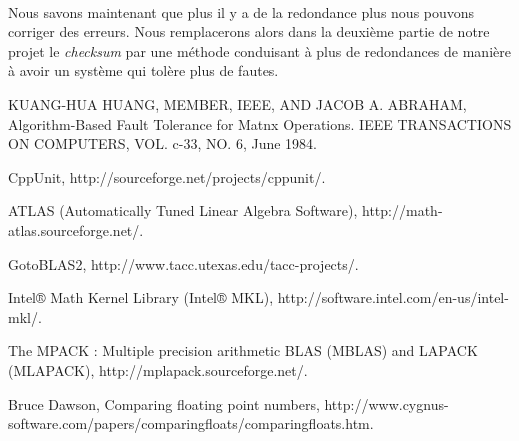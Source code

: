 \documentclass[a4paper, 10pt]{report}
\begin{document}
\paragraph*{}
Nous savons maintenant que plus il y a de la redondance plus nous pouvons corriger des erreurs.
Nous remplacerons alors dans la deuxième partie de notre projet le \textit{checksum} par une méthode conduisant à plus de 
redondances de manière à avoir un système qui tolère plus de fautes.

\begin{thebibliography}{1}

KUANG-HUA HUANG, MEMBER, IEEE, AND JACOB A. ABRAHAM,
Algorithm-Based Fault Tolerance for Matnx Operations.
IEEE TRANSACTIONS ON COMPUTERS,
VOL. c-33,
NO. 6,
June 1984.

CppUnit,
http://sourceforge.net/projects/cppunit/.

ATLAS (Automatically Tuned Linear Algebra Software),
http://math-atlas.sourceforge.net/.

GotoBLAS2,
http://www.tacc.utexas.edu/tacc-projects/.

Intel® Math Kernel Library (Intel® MKL),
http://software.intel.com/en-us/intel-mkl/.

The MPACK : Multiple precision arithmetic BLAS (MBLAS) and LAPACK (MLAPACK),
http://mplapack.sourceforge.net/.

Bruce Dawson,
Comparing floating point numbers,
http://www.cygnus-software.com/papers/comparingfloats/comparingfloats.htm.

\end{thebibliography}
\end{document}
